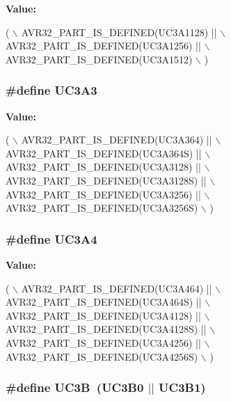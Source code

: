 {\bfseries Value\-:}
\begin{DoxyCode}
(   \(\backslash\)
        AVR32\_PART\_IS\_DEFINED(UC3A1128) || \(\backslash\)
        AVR32\_PART\_IS\_DEFINED(UC3A1256) || \(\backslash\)
        AVR32\_PART\_IS\_DEFINED(UC3A1512) \(\backslash\)
        )
\end{DoxyCode}
\hypertarget{group__uc3__part__macros__group_gae08aa32db9bd4a60a8cfa222f7ff74cc}{
\subsubsection[{U\-C3\-A3}]{\setlength{\rightskip}{0pt plus 5cm}\#define U\-C3\-A3}}\label{group__uc3__part__macros__group_gae08aa32db9bd4a60a8cfa222f7ff74cc}
{\bfseries Value\-:}
\begin{DoxyCode}
(   \(\backslash\)
        AVR32\_PART\_IS\_DEFINED(UC3A364)   || \(\backslash\)
        AVR32\_PART\_IS\_DEFINED(UC3A364S)  || \(\backslash\)
        AVR32\_PART\_IS\_DEFINED(UC3A3128)  || \(\backslash\)
        AVR32\_PART\_IS\_DEFINED(UC3A3128S) || \(\backslash\)
        AVR32\_PART\_IS\_DEFINED(UC3A3256)  || \(\backslash\)
        AVR32\_PART\_IS\_DEFINED(UC3A3256S) \(\backslash\)
        )
\end{DoxyCode}
\hypertarget{group__uc3__part__macros__group_ga633294c4776386c15ab2050644e77b4f}{
\subsubsection[{U\-C3\-A4}]{\setlength{\rightskip}{0pt plus 5cm}\#define U\-C3\-A4}}\label{group__uc3__part__macros__group_ga633294c4776386c15ab2050644e77b4f}
{\bfseries Value\-:}
\begin{DoxyCode}
(   \(\backslash\)
        AVR32\_PART\_IS\_DEFINED(UC3A464)   || \(\backslash\)
        AVR32\_PART\_IS\_DEFINED(UC3A464S)  || \(\backslash\)
        AVR32\_PART\_IS\_DEFINED(UC3A4128)  || \(\backslash\)
        AVR32\_PART\_IS\_DEFINED(UC3A4128S) || \(\backslash\)
        AVR32\_PART\_IS\_DEFINED(UC3A4256)  || \(\backslash\)
        AVR32\_PART\_IS\_DEFINED(UC3A4256S) \(\backslash\)
        )
\end{DoxyCode}
\hypertarget{group__uc3__part__macros__group_ga61e51606324c212eb11079e5acf592e0}{
\subsubsection[{U\-C3\-B}]{\setlength{\rightskip}{0pt plus 5cm}\#define U\-C3\-B~({\bf U\-C3\-B0} $|$$|$ {\bf U\-C3\-B1})}}\label{group__uc3__part__macros__group_ga61e51606324c212eb11079e5acf592e0}
